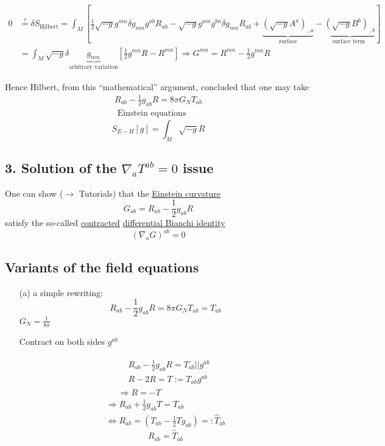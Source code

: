 \documentclass[10pt, twoside]{amsart}
\begin{document}
\begin{multicols*}{2}
\[
\begin{aligned}
  0 & \overset{!}{=} \delta S_{\text{Hilbert}} = \int_M [ \frac{1}{2} \sqrt{-g} g^{mn} \delta g_{mn} g^{ab} R_{ab} - \sqrt{-g} g^{am} g^{bn} \delta g_{mn} R_{ab}+    \underbrace{ (\sqrt{-g}A^a)_{ \, , a} }_{ \text{surface} } - \underbrace{ ( \sqrt{-g} B^b)_{ \, , b } }_{ \text{surface term } } ] \\
  & = \int_M \sqrt{-g} \delta \underbrace{g_{mn}}_{ \text{arbitrary variation}} [ \frac{1}{2} g^{mn} R - R^{mn} ] \Longrightarrow G^{mn} = R^{mn} - \frac{1}{2} g^{mn} R
\end{aligned}
\]

Hence Hilbert, from this ``mathematical'' argument, concluded that one may take
\[
\begin{gathered}
\boxed{ R_{ab} - \frac{1}{2} g_{ab} R = 8 \pi G_N T_{ab} }  \\
 \text{ Einstein equations}
\end{gathered}
\]
\[
S_{E-H}[g] = \int_M \sqrt{-g}R
\]

\subsection{3. Solution of the $\nabla_a T^{ab} =0$ issue}

One can show ($\to$ Tutorials) that the \underline{Einstein curvature}
\[
G_{ab} = R_{ab} - \frac{1}{2} g_{ab}R
\]
satisfy the so-called \underline{contracted} \underline{differential Bianchi identity}
\[
(\nabla_a G)^{ab} =0 
\]

\subsection{Variants of the field equations}

\begin{enumerate}
\item[(a)] a simple rewriting:
\[
R_{ab} - \frac{1}{2} g_{ab} R = 8 \pi G_N T_{ab} = T_{ab}
\]
$G_N = \frac{1}{8\pi}$

Contract on both sides $g^{ab}$

\[
\begin{gathered}
\begin{aligned}
  & R_{ab} - \frac{1}{2} g_{ab} R = T_{ab} || g^{ab} \\ 
  & R - 2R = T := T_{ab}g^{ab}
\end{aligned} \\
\Longrightarrow R = -T
\end{gathered}
\]
\[
\begin{gathered}
\Longrightarrow R_{ab} + \frac{1}{2} g_{ab} T = T_{ab} \\
\Longleftrightarrow R_{ab} = (T_{ab} - \frac{1}{2} Tg_{ab}) =: \widehat{T}_{ab}
\end{gathered}
\]
\[
\boxed{ R_{ab} = \widehat{T}_{ab}}
\]


\end{enumerate}
\end{multicols*}
\end{document}
